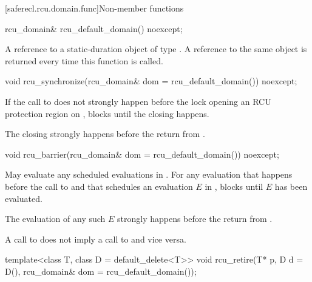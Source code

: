 [saferecl.rcu.domain.func]{Non-member functions}

%
\begin{itemdecl}
rcu_domain& rcu_default_domain() noexcept;
\end{itemdecl}

\begin{itemdescr}
\pnum
\returns
A reference to a static-duration object of type .
A reference to the same object is returned every time this function is called.
\end{itemdescr}

%
\begin{itemdecl}
void rcu_synchronize(rcu_domain& dom = rcu_default_domain()) noexcept;
\end{itemdecl}

\begin{itemdescr}
\pnum
\effects
If the call to  does not strongly happen before
the lock opening an RCU protection region  on ,
blocks until the  closing  happens.

\pnum
\sync
The  closing 
strongly happens before the return from .
\end{itemdescr}

%
\begin{itemdecl}
void rcu_barrier(rcu_domain& dom = rcu_default_domain()) noexcept;
\end{itemdecl}

\begin{itemdescr}
\pnum
\effects
May evaluate any scheduled evaluations in .
For any evaluation that happens before the call to  and
that schedules an evaluation $E$ in ,
blocks until $E$ has been evaluated.

\pnum
\sync
The evaluation of any such $E$
strongly happens before the return from .

\begin{note}
A call to  does not imply
a call to  and vice versa.
\end{note}
\end{itemdescr}

%
\begin{itemdecl}
template<class T, class D = default_delete<T>>
  void rcu_retire(T* p, D d = D(), rcu_domain& dom = rcu_default_domain());
\end{itemdecl}

